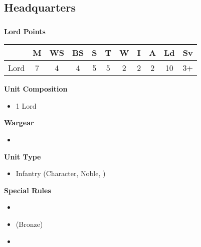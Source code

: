 \subsection{Headquarters}

\newpage
\subsubsection[Lord]{}

\hspace{0.5em}
\begin{minipage}[t]{0.72\textwidth}
	{\large \textbf{Lord  Points}}
	
	\begin{tabular}{m{165 pt} *{10}{c}}
		& M & WS & BS & S & T & W & I & A & Ld & Sv \\
		\hline
		Lord & 7 & 4 & 4 & 5 & 5 & 2 & 2 & 2 & 10 & 3+ \\
	\end{tabular}
	\small
	\begin{minipage}{0.5\textwidth}
		\vspace*{2em}
		\textbf{Unit Composition}
		\begin{itemize}
			\item 1 Lord
		\end{itemize}
		
		\textbf{Wargear}
		\begin{itemize}
			\item {}
		\end{itemize}
	\end{minipage}
	\begin{minipage}{0.5\textwidth}
		\vspace*{2em}
		\textbf{Unit Type}
		\begin{itemize}
			\item Infantry (Character, Noble, )
		\end{itemize}
		
		\textbf{Special Rules}
		\begin{itemize}
			\item {}
			\item {} (Bronze)
			\item {}
		\end{itemize}
	\end{minipage}
	

\end{minipage}
